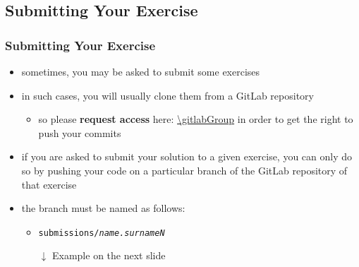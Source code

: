 \documentclass[presentation]{beamer}\mode<presentation>{\usetheme{AMSBolognaFC}}
\begin{document}
\subsection{Submitting Your Exercise}

\begin{frame}%
\frametitle{Submitting Your Exercise}

    \begin{itemize}

        \item sometimes, you may be asked to submit some exercises

        \item in such cases, you will usually clone them from a GitLab repository
        \begin{itemize}
            \item so please \textbf{request access} here: \url{\gitlabGroup} in order to get the right to push your commits
        \end{itemize}

        \item if you are asked to submit your solution to a given exercise, you can only do so by \alert{pushing} your code on a particular branch of the GitLab repository of that exercise

        \item the branch must be named as follows:
        \begin{itemize}

            \item \texttt{submissions/\alert{\textit{name.surnameN}}}%

            \vspace{.3cm}



            \vspace{.3cm}

            \item[$\downarrow$] Example on the next slide

        \end{itemize}

    \end{itemize}
\end{frame}
\end{document}
